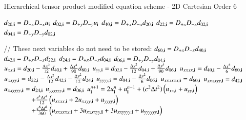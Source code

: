 \renewcommand{\algFontSize}{\small}
\begin{algorithm}[H]
\algFontSize 
\caption{Hierarchical tensor product modified equation scheme - 2D Cartesian Order 6}
\begin{algorithmic}[1]

    \For{ $\iv$ } 
       \State $d_{20,\mathbf{ i}} = D_{+x}D_{-x} u_{\mathbf{ i}}$ 
       \State $d_{02,\mathbf{ i}} = D_{+y}D_{-y} u_{\mathbf{ i}}$ 
    \EndFor
    \For{ $\iv$ } 
       \State $d_{40,\mathbf{ i}} = D_{+x}D_{-x} d_{20,\mathbf{ i}}$ 
       \State $d_{22,\mathbf{ i}} = D_{+x}D_{-x} d_{02,\mathbf{ i}}$ 
       \State $d_{04,\mathbf{ i}} = D_{+y}D_{-y} d_{02,\mathbf{ i}}$ 
    \EndFor

    \For{ $\iv$ } 
       \State // These next variables do not need to be stored: 
       \State $d_{60,\mathbf{ i}} = D_{+x}D_{-x} d_{40,\mathbf{ i}}$ 
       \State $d_{42,\mathbf{ i}} = D_{+x}D_{-x} d_{22,\mathbf{ i}}$ 
       \State $d_{24,\mathbf{ i}} = D_{+x}D_{-x} d_{04,\mathbf{ i}}$ 
       \State $d_{06,\mathbf{ i}} = D_{+y}D_{-y} d_{04,\mathbf{ i}}$ 
       \State    
       \State $u_{xx,\mathbf{ i}} = d_{20,\mathbf{ i}} - \frac{\Delta x^2}{12} d_{40,\mathbf{ i}} + \frac{\Delta x^4}{90} d_{60,\mathbf{ i}}$   
       \State $u_{yy,\mathbf{ i}} = d_{02,\mathbf{ i}} - \frac{\Delta y^2}{12} d_{04,\mathbf{ i}} + \frac{\Delta y^4}{90} d_{06,\mathbf{ i}}$
       \State $u_{xxxx,\mathbf{ i}} = d_{40,\mathbf{ i}} - \frac{\Delta x^2}{6} d_{60,\mathbf{ i}}$                             
       \State $u_{xxyy,\mathbf{ i}} = d_{22,\mathbf{ i}} - \frac{\Delta x^2}{12} d_{42,\mathbf{ i}} - \frac{\Delta y^2}{12} d_{24,\mathbf{ i}} $
       \State $u_{yyyy,\mathbf{ i}} = d_{04,\mathbf{ i}} - \frac{\Delta y^2}{6} d_{06,\mathbf{ i}} $
       \State $u_{xxxxxx,\mathbf{ i}} = d_{60,\mathbf{ i}}$                                                     
       \State $u_{xxxxyy,\mathbf{ i}} = d_{42,\mathbf{ i}}$
       \State $u_{xxyyyy,\mathbf{ i}} = d_{24,\mathbf{ i}}$
       \State $u_{yyyyyy,\mathbf{ i}} = d_{06,\mathbf{ i}}$
       \State 
       \State $u^{n+1}_{\mathbf{ i}} = 2 u^n_{\mathbf{ i}} + u^{n-1}_{\mathbf{ i}} + (c^2\Delta t^2)\left( u_{xx,\mathbf{ i}} + u_{yy,\mathbf{ i}} \right)   $
       \State $\qquad\qquad + \frac{c^4\Delta t^4}{12} \left( u_{xxxx,\mathbf{ i}} + 2 u_{xxyy,\mathbf{ i}} +  u_{yyyy,\mathbf{ i}} \right)$
       \State $\qquad\qquad + \frac{c^6\Delta t^6}{360} \left( u_{xxxxxx,\mathbf{ i}} + 3 u_{xxxxyy,\mathbf{ i}}+ 3 u_{xxyyyy,\mathbf{ i}} +  u_{yyyyyy,\mathbf{ i}} \right)$
    \EndFor     


\end{algorithmic}
\end{algorithm}
